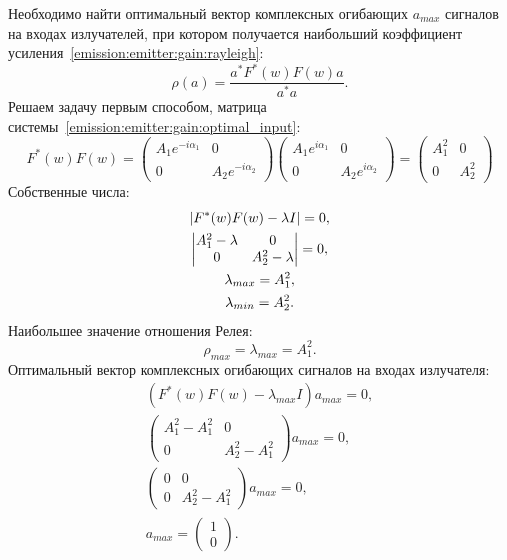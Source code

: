 Необходимо найти оптимальный вектор комплексных огибающих $a_{max}$ сигналов на входах излучателей, при котором получается наибольший коэффициент
усиления~\eqref{emission:emitter:gain:rayleigh}:
\[
    \rho(a)
    = \frac{a^* F^*(w) F(w) a}{a^* a}.
\]
Решаем задачу первым способом, матрица системы~\eqref{emission:emitter:gain:optimal_input}:
\[
    F^*(w) F(w)
    =
    \begin{pmatrix}
        A_1 e^{-i \alpha_1} & 0                   \\
        0                   & A_2 e^{-i \alpha_2}
    \end{pmatrix}
    \begin{pmatrix}
        A_1 e^{i \alpha_1} & 0                  \\
        0                  & A_2 e^{i \alpha_2}
    \end{pmatrix}
    =
    \begin{pmatrix}
        A_1^2 & 0     \\
        0     & A_2^2
    \end{pmatrix}
\]
Собственные числа:
\begin{gather*}
    \determinant{F^*(w) F(w) - \lambda I} = 0 , \\
%
    \begin{vmatrix}
        A_1^2 - \lambda & 0               \\
        0               & A_2^2 - \lambda
    \end{vmatrix}
    = 0 , \\
%
    \lambda_{max} = A_1^2 , \\
    \lambda_{min} = A_2^2 .
\end{gather*}
Наибольшее значение отношения Релея:
\[
    \rho_{max} = \lambda_{max} = A_1^2 .
\]
Оптимальный вектор комплексных огибающих сигналов на входах излучателя:
\begin{gather*}
    ( F^*(w) F(w) - \lambda_{max} I ) a_{max} = 0 , \\
%
    \begin{pmatrix}
        A_1^2 - A_1^2 & 0             \\
        0             & A_2^2 - A_1^2
    \end{pmatrix}
    a_{max} = 0 , \\
%
    \begin{pmatrix}
        0 & 0             \\
        0 & A_2^2 - A_1^2
    \end{pmatrix}
    a_{max} = 0 , \\
%
    a_{max}
    = \begin{pmatrix}
          1 \\
          0
    \end{pmatrix} .
\end{gather*}
